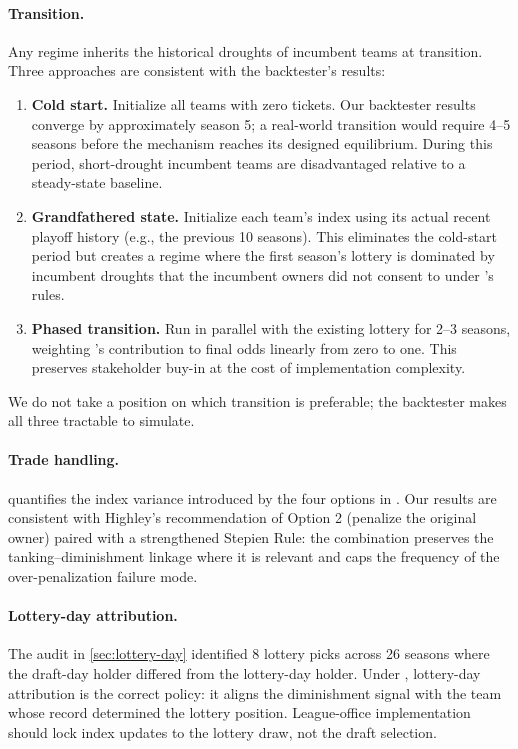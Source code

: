 \paragraph{Transition.} Any \cola{} regime inherits the historical droughts of incumbent teams at transition. Three approaches are consistent with the backtester's results:
\begin{enumerate}
    \item \textbf{Cold start.} Initialize all teams with zero tickets. Our backtester results converge by approximately season 5; a real-world transition would require 4--5 seasons before the mechanism reaches its designed equilibrium. During this period, short-drought incumbent teams are disadvantaged relative to a steady-state baseline.
    \item \textbf{Grandfathered state.} Initialize each team's index using its actual recent playoff history (e.g., the previous 10 seasons). This eliminates the cold-start period but creates a regime where the first season's lottery is dominated by incumbent droughts that the incumbent owners did not consent to under \cola{}'s rules.
    \item \textbf{Phased transition.} Run \cola{} in parallel with the existing lottery for 2--3 seasons, weighting \cola{}'s contribution to final odds linearly from zero to one. This preserves stakeholder buy-in at the cost of implementation complexity.
\end{enumerate}
We do not take a position on which transition is preferable; the backtester makes all three tractable to simulate.

\paragraph{Trade handling.}  quantifies the index variance introduced by the four options in \citet{highley2026solvable4}. Our results are consistent with Highley's recommendation of Option 2 (penalize the original owner) paired with a strengthened Stepien Rule: the combination preserves the tanking--diminishment linkage where it is relevant and caps the frequency of the over-penalization failure mode.

\paragraph{Lottery-day attribution.} The audit in \cref{sec:lottery-day} identified 8 lottery picks across 26 seasons where the draft-day holder differed from the lottery-day holder. Under \cola{}, lottery-day attribution is the correct policy: it aligns the diminishment signal with the team whose record determined the lottery position. League-office implementation should lock index updates to the lottery draw, not the draft selection.

